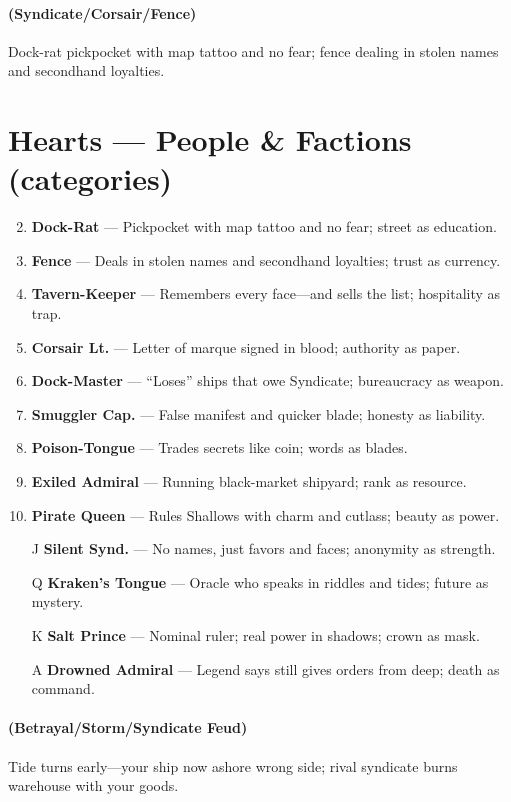 \paragraph*{(Syndicate/Corsair/Fence)} Dock-rat pickpocket with map tattoo and no fear; fence dealing in stolen names and secondhand loyalties.

\section*{Hearts --- People \& Factions (categories)}
\label{sec:zakov-people}
\begin{enumerate}
\setcounter{enumi}{1}
\item \textbf{Dock-Rat} --- Pickpocket with map tattoo and no fear; street as education.
\item \textbf{Fence} --- Deals in stolen names and secondhand loyalties; trust as currency.
\item \textbf{Tavern-Keeper} --- Remembers every face---and sells the list; hospitality as trap.
\item \textbf{Corsair Lt.} --- Letter of marque signed in blood; authority as paper.
\item \textbf{Dock-Master} --- ``Loses'' ships that owe Syndicate; bureaucracy as weapon.
\item \textbf{Smuggler Cap.} --- False manifest and quicker blade; honesty as liability.
\item \textbf{Poison-Tongue} --- Trades secrets like coin; words as blades.
\item \textbf{Exiled Admiral} --- Running black-market shipyard; rank as resource.
\item \textbf{Pirate Queen} --- Rules Shallows with charm and cutlass; beauty as power.
\item[J] \textbf{Silent Synd.} --- No names, just favors and faces; anonymity as strength.
\item[Q] \textbf{Kraken's Tongue} --- Oracle who speaks in riddles and tides; future as mystery.
\item[K] \textbf{Salt Prince} --- Nominal ruler; real power in shadows; crown as mask.
\item[A] \textbf{Drowned Admiral} --- Legend says still gives orders from deep; death as command.
\end{enumerate}

\paragraph*{(Betrayal/Storm/Syndicate Feud)} Tide turns early---your ship now ashore wrong side; rival syndicate burns warehouse with your goods.

